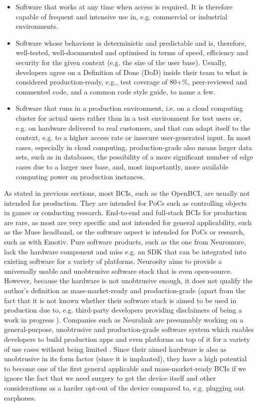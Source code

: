 \begin{itemize}
  \item Software that works at any time when access is required. It is therefore capable of frequent and intensive use in, e.g. commercial or industrial environments.
  \item Software whose behaviour is deterministic and predictable and is, therefore, well-tested, well-documented and optimised in terms of speed, efficiency and security for the given context (e.g. the size of the user base). Usually, developers agree on a Definition of Done (DoD) inside their team to what is considered production-ready, e.g., test coverage of 80+\%, peer-reviewed and commented code, and a common code style guide, to name a few.
  \item Software that runs in a production environment, i.e. on a cloud computing cluster for actual users rather than in a test environment for test users or, e.g. on hardware delivered to real customers, and that can adapt itself to the context, e.g. to a higher access rate or insecure user-generated input. In most cases, especially in cloud computing, production-grade also means larger data sets, such as in databases, the possibility of a more significant number of edge cases due to a larger user base, and, most importantly, more available computing power on production instances.
\end{itemize}

As stated in previous sections, most BCIs, such as the OpenBCI, are usually not intended for production. They are intended for PoCs such as controlling objects in games or conducting research. End-to-end and full-stack BCIs for production are rare, as most are very specific and not intended for general applicability, such as the Muse headband, or the software aspect is intended for PoCs or research, such as with Emotiv. Pure software products, such as the one from Neuromore, lack the hardware component and miss e.g. an SDK that can be integrated into existing software for a variety of platforms. Neurosity aims to provide a universally usable and unobtrusive software stack that is even open-source. However, because the hardware is not unobtrusive enough, it does not qualify the author's definition as mass-market-ready and production-grade (apart from the fact that it is not known whether their software stack is aimed to be used in production \citep{neurosity_neurosity_2022} due to, e.g. third-party developers providing disclaimers of being a work in progress \citep{turney_notion_2022}). Companies such as Neuralink are presumably working on a general-purpose, unobtrusive and production-grade software system which enables developers to build production apps and even platforms on top of it for a variety of use cases without being limited \citep{musk_integrated_2019}. Since their aimed hardware is also as unobtrusive in its form factor (since it is implanted), they have a high potential to become one of the first general applicable and mass-market-ready BCIs if we ignore the fact that we need surgery to get the device itself \citep{neuralink_approach_nodate} and other considerations as a harder opt-out of the device compared to, e.g. plugging out earphones.


